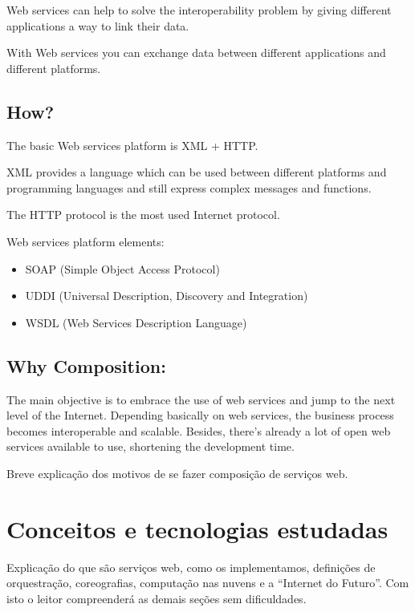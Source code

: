 \documentclass[11pt,a4paper]{article}
\begin{document}
Web services can help to solve the interoperability problem by giving different applications a way to link their data.

With Web services you can exchange data between different applications and different platforms.

\subsection{How?}
The basic Web services platform is XML + HTTP.

XML provides a language which can be used between different platforms and programming languages and still express complex messages and functions.

The HTTP protocol is the most used Internet protocol.

Web services platform elements:
\begin{itemize}
\item SOAP (Simple Object Access Protocol)
\item UDDI (Universal Description, Discovery and Integration)
\item WSDL (Web Services Description Language)
\end{itemize}


\subsection{Why Composition:}
The main objective is to embrace the use of web services and jump to the next level of the Internet. Depending basically on web services, the business process becomes interoperable and scalable. Besides, there's already a lot of open web services available to use, shortening the development time.








Breve explicação dos motivos de se fazer composição de serviços web.




\section{Conceitos e tecnologias estudadas}
Explicação do que são serviços web, como os implementamos, definições de orquestração, coreografias, computação nas nuvens e a ``Internet do Futuro''. Com isto o leitor compreenderá as demais seções sem dificuldades.
\end{document}
